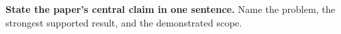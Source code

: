 \noindent
\textbf{State the paper's central claim in one sentence.} Name the problem,
the strongest supported result, and the demonstrated scope.
